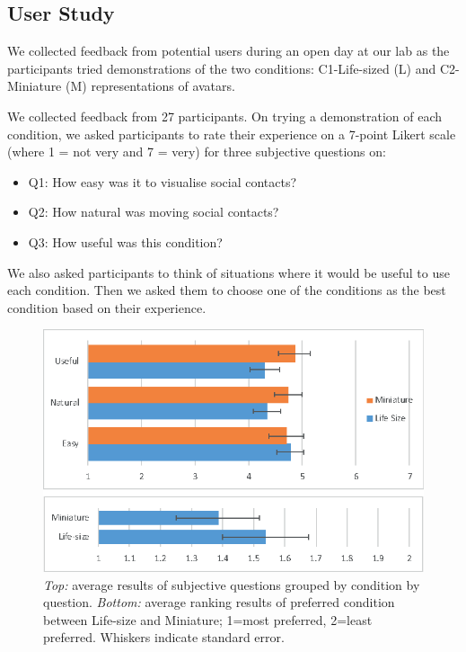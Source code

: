 \subsection{User Study}

We collected feedback from potential users during an open day at our lab as the participants tried demonstrations of the two conditions: C1-Life-sized (L) and C2-Miniature (M) representations of avatars. 

We collected feedback from 27 participants. On trying a demonstration of each condition, we asked participants to rate their experience on a 7-point Likert scale (where 1 = not very and 7 = very) for three subjective questions on: 

\begin{itemize}
    \item Q1: How easy was it to visualise social contacts?
    \item Q2: How natural was moving social contacts?
    \item Q3: How useful was this condition?
\end{itemize}

We also asked participants to think of situations where it would be useful to use each condition. Then we asked them to choose one of the conditions as the best condition based on their experience. 

\begin{figure}[h]
    \centering
    \includegraphics[width=0.8\linewidth]{images/ismar17/images-09.eps}
    \caption{\textit{Top:} average results of subjective questions grouped by condition by question. \textit{Bottom:} average ranking results of preferred condition between Life-size and Miniature; 1=most preferred, 2=least preferred. Whiskers indicate standard error.}
    \label{fig:continuum:results}
\end{figure}

